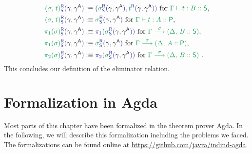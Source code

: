 \begin{defn}
\begin{align*}
\tqm{\grm{(\sigma,\,t)}^\RR_\Sc(\blgamma, \blgammaCC)}
  &:\equiv \tqm{(\grm{\sigma}^\RR_\Sc(\blgamma, \blgammaCC) , \grm{t}^\RR(\blgamma, \blgammaCC))}
    \text{ for \grm{\Gamma \vdash t : B :: \Sc},} \\
\tqm{\grm{(\sigma,\,t)}^\RR_\Sc(\blgamma, \blgammaCC)}
  &:\equiv \tqm{\grm{\sigma}^\RR_\Sc(\blgamma, \blgammaCC)} \text{ for \grm{\Gamma \vdash t : A :: \Pc},} \\
\tqm{\grm{\pi_1(\sigma)}^\RR_\Sc(\blgamma, \blgammaCC)}
  &:\equiv \tqm{\pi_1(\grm{\sigma}^\RR_\Sc(\blgamma, \blgammaCC))} \text{ for \grm{\IISub{\sigma}{\Gamma}{(\Delta,\, B :: \Sc)}},} \\
\tqm{\grm{\pi_1(\sigma)}^\RR_\Sc(\blgamma, \blgammaCC)}
  &:\equiv \tqm{\grm{\sigma}^\RR_\Sc(\blgamma, \blgammaCC)} \text{ for \grm{\IISub{\sigma}{\Gamma}{(\Delta,\, A :: \Pc)}},} \\
\tqm{\grm{\pi_2(\sigma)}^\RR_\Sc(\blgamma, \blgammaCC)}
  &:\equiv \tqm{\pi_2(\grm{\sigma}^\RR_\Sc(\blgamma, \blgammaCC))} \text{ for \grm{\IISub{\sigma}{\Gamma}{(\Delta ,\, B :: \Sc)}} .}
\end{align*}
This concludes our definition of the eliminator relation.
\end{defn}

\section{Formalization in Agda}

Most parts of this chapter have been formalized in the theorem prover Agda.
In the following, we will describe this formalization including the problems we faced.
The formalizations can be found online at \url{https://github.com/javra/indind-agda}.

